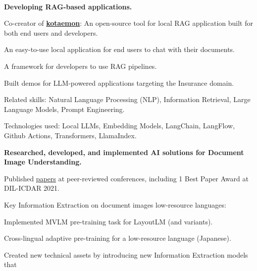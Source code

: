 \\
\begin{xitemize}
    \item \textbf{Developing RAG-based applications.}
    \begin{zitemize}
        \item Co-creator of \href{https://github.com/Cinnamon/kotaemon}{\textbf{kotaemon}}: An
        open-source tool for local RAG application built for both end users and developers.
        \begin{zitemize}
            \vspace{1ex}
            \item An easy-to-use local application for end users to chat with their documents.
            \item A framework for developers to use RAG pipelines.
        \end{zitemize}
        \item Built demos for LLM-powered applications targeting the Insurance domain.
        \item Related skills: Natural Language Processing (NLP), Information Retrieval, Large Language Models, Prompt Engineering.
        \item Technologies used: Local LLMs, Embedding Models, LangChain, LangFlow, Github Actions, Transformers, LlamaIndex.
    \end{zitemize}
    \item \textbf{Researched, developed, and implemented AI solutions for Document Image Understanding.}
    \begin{zitemize}
        \item Published \href{https://scholar.google.com/citations?user=\gscholarid}{papers} at
        peer-reviewed conferences, including 1 Best Paper Award at DIL-ICDAR 2021.
        \item Key Information Extraction on document images low-resource languages:
        \vspace{1ex}
        \begin{zitemize}
            \item Implemented MVLM pre-training task for LayoutLM (and variants).
            \item Cross-lingual adaptive pre-training for a low-resource language (Japanese).
            \item Created new technical assets by introducing new Information Extraction models that

\end{zitemize}
\end{zitemize}
\end{xitemize}
